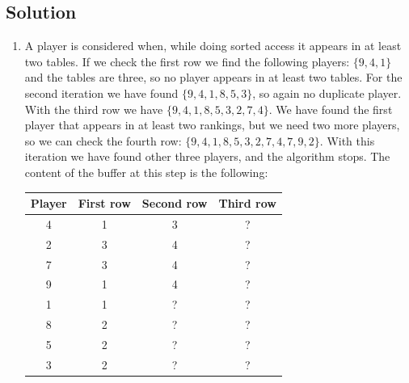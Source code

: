 \documentclass[12pt, a4paper]{report}
\begin{document}
    \subsection*{Solution}
    \begin{enumerate}
        \item A player is considered when, while doing sorted access it appears in at least two tables. If we check the first row we find the following players: 
            $\{9,4,1\}$ and the tables are three, so no player appears in at least two tables. For the second iteration we have found $\{9,4,1,8,5,3\}$, so again
            no duplicate player. With the third row we have $\{9,4,1,8,5,3,2,7,4\}$. We have found the first player that appears in at least two rankings, but we 
            need two more players, so we can check the fourth row: $\{9,4,1,8,5,3,2,7,4,7,9,2\}$. With this iteration we have found other three players, and 
            the algorithm stops. The content of the buffer at this step is the following: 
            \begin{table}[H]
                \centering
                \begin{tabular}{|c|ccc|}
                \hline
                \textbf{Player} & \textbf{First row} & \textbf{Second row} & \textbf{Third row} \\ \hline
                4               & 1                  & 3                   & ?                  \\
                2               & 3                  & 4                   & ?                  \\
                7               & 3                  & 4                   & ?                  \\ 
                9               & 1                  & 4                   & ?                  \\
                1               & 1                  & ?                   & ?                  \\
                8               & 2                  & ?                   & ?                  \\
                5               & 2                  & ?                   & ?                  \\
                3               & 2                  & ?                   & ?                  \\ \hline
                \end{tabular}
            \end{table}

\end{enumerate}
\end{document}
